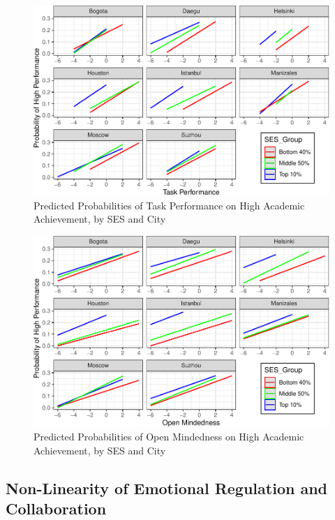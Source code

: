 \documentclass{article}
\begin{document}
\begin{figure}
\centering
\includegraphics{working_paper_files/figure-latex/scatter task perf-1.pdf}
\caption{Predicted Probabilities of Task Performance on High Academic
Achievement, by SES and City}
\end{figure}

\begin{figure}
\centering
\includegraphics{working_paper_files/figure-latex/scatter open-1.pdf}
\caption{Predicted Probabilities of Open Mindedness on High Academic
Achievement, by SES and City}
\end{figure}

\hypertarget{non-linearity-of-emotional-regulation-and-collaboration}{%
\subsection{Non-Linearity of Emotional Regulation and
Collaboration}\label{non-linearity-of-emotional-regulation-and-collaboration}}
\end{document}
